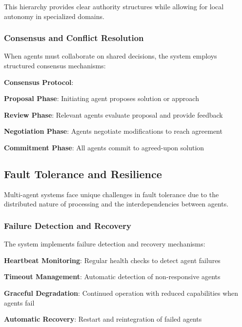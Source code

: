 This hierarchy provides clear authority structures while allowing for local autonomy in specialized domains.

\subsubsection*{Consensus and Conflict Resolution}

When agents must collaborate on shared decisions, the system employs structured consensus mechanisms:

\begin{alertbox}
\textbf{Consensus Protocol}:
\begin{compactlist}
    \item \textbf{Proposal Phase}: Initiating agent proposes solution or approach
    \item \textbf{Review Phase}: Relevant agents evaluate proposal and provide feedback
    \item \textbf{Negotiation Phase}: Agents negotiate modifications to reach agreement
    \item \textbf{Commitment Phase}: All agents commit to agreed-upon solution
\end{compactlist}
\end{alertbox}

\subsection*{Fault Tolerance and Resilience}

Multi-agent systems face unique challenges in fault tolerance due to the distributed nature of processing and the interdependencies between agents.

\subsubsection*{Failure Detection and Recovery}

The system implements failure detection and recovery mechanisms:

\begin{expandedlist}
    \item \textbf{Heartbeat Monitoring}: Regular health checks to detect agent failures
    \item \textbf{Timeout Management}: Automatic detection of non-responsive agents
    \item \textbf{Graceful Degradation}: Continued operation with reduced capabilities when agents fail
    \item \textbf{Automatic Recovery}: Restart and reintegration of failed agents
\end{expandedlist}

